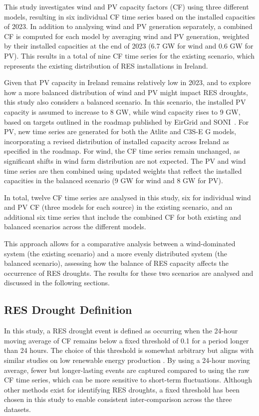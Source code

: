 \documentclass[a4paper, 11pt]{article}
\begin{document}
This study investigates wind and PV capacity factors (CF) using three different models, resulting in six individual CF time series based on the installed capacities of 2023. In addition to analysing wind and PV generation separately, a combined CF is computed for each model by averaging wind and PV generation, weighted by their installed capacities at the end of 2023 (6.7 GW for wind and 0.6 GW for PV). This results in a total of nine CF time series for the existing scenario, which represents the existing distribution of RES installations in Ireland.

Given that PV capacity in Ireland remains relatively low in 2023, and to explore how a more balanced distribution of wind and PV might impact RES droughts, this study also considers a balanced scenario. In this scenario, the installed PV capacity is assumed to increase to 8 GW, while wind capacity rises to 9 GW, based on targets outlined in the roadmap published by EirGrid and SONI~\cite{eirgrid2023future}. For PV, new time series are generated for both the Atlite and C3S-E G models, incorporating a revised distribution of installed capacity across Ireland as specified in the roadmap. For wind, the CF time series remain unchanged, as significant shifts in wind farm distribution are not expected. The PV and wind time series are then combined using updated weights that reflect the installed capacities in the balanced scenario (9 GW for wind and 8 GW for PV).

In total, twelve CF time series are analysed in this study, six for individual wind and PV CF (three models for each source) in the existing scenario, and an additional six time series that include the combined CF for both existing and balanced scenarios across the different models.

This approach allows for a comparative analysis between a wind-dominated system (the existing scenario) and a more evenly distributed system (the balanced scenario), assessing how the balance of RES capacity affects the occurrence of RES droughts. The results for these two scenarios are analysed and discussed in the following sections.

\subsection{RES Drought Definition}
\label{sec:res_drought}

In this study, a RES drought event is defined as occurring when the 24-hour moving average of CF remains below a fixed threshold of 0.1 for a period longer than 24 hours. The choice of this threshold is somewhat arbitrary but aligns with similar studies on low renewable energy production \cite{kaspar2019drought, ohba2022drought, mayer2023drought} . By using a 24-hour moving average, fewer but longer-lasting events are captured compared to using the raw CF time series, which can be more sensitive to short-term fluctuations. Although other methods exist for identifying RES droughts, a fixed threshold has been chosen in this study to enable consistent inter-comparison across the three datasets.
\end{document}

